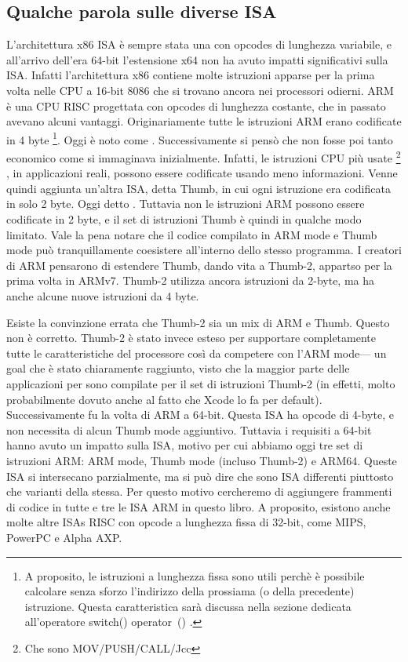 %
%
%

\subsection{Qualche parola sulle diverse \ac{ISA}}
L'architettura x86 \ac{ISA} è sempre stata una con opcodes di lunghezza variabile, e all'arrivo dell'era 64-bit l'estensione x64 non ha avuto impatti significativi sulla \ac{ISA}. Infatti l'architettura x86 contiene molte istruzioni apparse per la prima volta nelle CPU a 16-bit 8086 che si trovano ancora nei processori odierni.
ARM è una \ac{CPU} \ac{RISC} progettata con opcodes di lunghezza costante, che in passato avevano alcuni vantaggi.
Originariamente tutte le istruzioni ARM erano codificate in 4 byte%
\footnote{
A proposito, le istruzioni a lunghezza fissa sono utili perchè è possibile calcolare senza sforzo l'indirizzo della prossiama (o della precedente) istruzione. Questa caratteristica sarà discussa nella sezione dedicata all'operatore switch() operator~() .
}.
Oggi è noto come .
Successivamente si pensò che non fosse poi tanto economico come si immaginava inizialmente.
Infatti, le istruzioni \ac{CPU} più usate \footnote{Che sono MOV/PUSH/CALL/Jcc} , in applicazioni reali, possono essere codificate usando meno informazioni.
Venne quindi aggiunta un'altra \ac{ISA}, detta Thumb, in cui ogni istruzione era codificata in solo 2 byte.
Oggi detto .
Tuttavia non  le istruzioni ARM possono essere codificate in 2 byte, e il set di istruzioni Thumb è quindi in qualche modo limitato.
Vale la pena notare che il codice compilato in ARM mode e Thumb mode può tranquillamente coesistere all'interno dello stesso programma.
I creatori di ARM pensarono di estendere Thumb, dando vita a Thumb-2, appartso per la prima volta in ARMv7.
Thumb-2 utilizza ancora istruzioni da 2-byte, ma ha anche alcune nuove istruzioni da 4 byte. 

Esiste la convinzione errata che Thumb-2 sia un mix di ARM e Thumb. Questo non è corretto. 
Thumb-2 è stato invece esteso per supportare completamente tutte le caratteristiche del processore così da competere con l'ARM mode--- un goal che è stato chiaramente raggiunto, visto che la maggior parte delle applicazioni per \idevices sono compilate per il set di istruzioni Thumb-2 (in effetti, molto probabilmente dovuto anche al fatto che Xcode lo fa per default).
Successivamente fu la volta di ARM a 64-bit. Questa \ac{ISA} ha opcode di 4-byte, e non necessita di alcun Thumb mode aggiuntivo.
Tuttavia i requisiti a 64-bit hanno avuto un impatto sulla \ac{ISA}, motivo per cui abbiamo oggi tre set di istruzioni ARM: ARM mode, Thumb mode (incluso Thumb-2) e ARM64.
Queste \ac{ISA} si intersecano parzialmente, ma si può dire che sono \ac{ISA} differenti piuttosto che varianti della stessa.
Per questo motivo cercheremo di aggiungere frammenti di codice in tutte e tre le \ac{ISA} ARM in questo libro.
%
%
%
A proposito, esistono anche molte altre \ac{ISA}s \ac{RISC} con opcode a lunghezza fissa di 32-bit, come MIPS, PowerPC e Alpha AXP.
